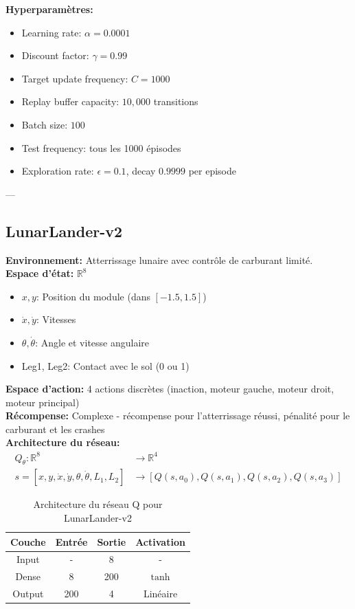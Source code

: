 \textbf{Hyperparamètres:}
\begin{itemize}
    \item Learning rate: $\alpha = 0.0001$
    \item Discount factor: $\gamma = 0.99$
    \item Target update frequency: $C = 1000$
    \item Replay buffer capacity: $10,000$ transitions
    \item Batch size: $100$
    \item Test frequency: tous les 1000 épisodes
    \item Exploration rate: $\epsilon = 0.1$, decay $0.9999$ per episode
\end{itemize}

---

\subsection{LunarLander-v2}

\textbf{Environnement:} Atterrissage lunaire avec contrôle de carburant limité. \\
\textbf{Espace d'état:} $\mathbb{R}^8$
\begin{itemize}
    \item $x, y$: Position du module (dans $[-1.5, 1.5]$)
    \item $\dot{x}, \dot{y}$: Vitesses
    \item $\theta, \dot{\theta}$: Angle et vitesse angulaire
    \item Leg1, Leg2: Contact avec le sol (0 ou 1)
\end{itemize}

\textbf{Espace d'action:} 4 actions discrètes (inaction, moteur gauche, moteur droit, moteur principal) \\
\textbf{Récompense:} Complexe - récompense pour l'atterrissage réussi, pénalité pour le carburant et les crashes \\

\textbf{Architecture du réseau:}
\[
\begin{aligned}
Q_\theta : \mathbb{R}^8 &\to \mathbb{R}^4 \\
s = [x, y, \dot{x}, \dot{y}, \theta, \dot{\theta}, L_1, L_2] &\to [Q(s, a_0), Q(s, a_1), Q(s, a_2), Q(s, a_3)]
\end{aligned}
\]

\vspace{0.3cm}
\begin{table}[h!]
    \centering
    \begin{tabular}{|c|c|c|c|}
    \hline
    \textbf{Couche} & \textbf{Entrée} & \textbf{Sortie} & \textbf{Activation} \\
    \hline
    Input & - & 8 & - \\
    \hline
    Dense & 8 & 200 & $\tanh$ \\
    \hline
    Output & 200 & 4 & Linéaire \\
    \hline
    \end{tabular}
    \caption{Architecture du réseau Q pour LunarLander-v2}
\end{table}

